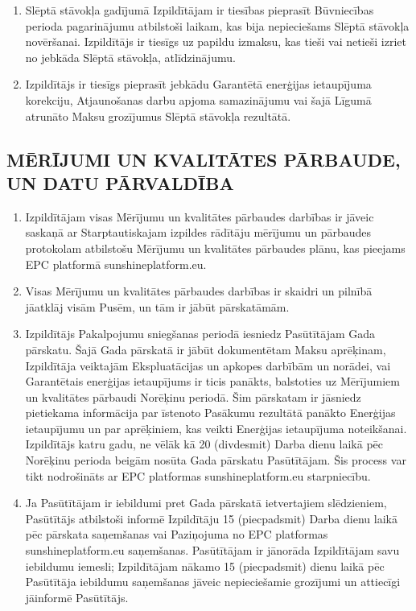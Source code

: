 \begin{multicols}{2}
\begin{enumerate}
	\item Slēptā stāvokļa gadījumā Izpildītājam ir tiesības pieprasīt Būvniecības perioda pagarinājumu atbilstoši laikam, kas bija nepieciešams Slēptā stāvokļa novēršanai. Izpildītājs ir tiesīgs uz papildu izmaksu, kas tieši vai netieši izriet no jebkāda Slēptā stāvokļa, atlīdzinājumu.
	\item Izpildītājs ir tiesīgs pieprasīt jebkādu Garantētā enerģijas ietaupījuma korekciju, Atjaunošanas darbu apjoma samazinājumu vai šajā Līgumā atrunāto Maksu grozījumus Slēptā stāvokļa rezultātā.
\end{enumerate}

\subsection{MĒRĪJUMI UN KVALITĀTES PĀRBAUDE, UN DATU PĀRVALDĪBA}
\begin{enumerate}
	\item Izpildītājam visas Mērījumu un kvalitātes pārbaudes darbības ir jāveic saskaņā ar Starptautiskajam izpildes rādītāju mērījumu un pārbaudes protokolam atbilstošu Mērījumu un kvalitātes pārbaudes plānu, kas pieejams EPC platformā sunshineplatform.eu.
	\item Visas Mērījumu un kvalitātes pārbaudes darbības ir skaidri un pilnībā jāatklāj visām Pusēm, un tām ir jābūt pārskatāmām.
	\item Izpildītājs Pakalpojumu sniegšanas periodā iesniedz Pasūtītājam Gada pārskatu. Šajā Gada pārskatā ir jābūt dokumentētam Maksu aprēķinam, Izpildītāja veiktajām Ekspluatācijas un apkopes darbībām un norādei, vai Garantētais enerģijas ietaupījums ir ticis panākts, balstoties uz Mērījumiem un kvalitātes pārbaudi Norēķinu periodā. Šim pārskatam ir jāsniedz pietiekama informācija par īstenoto Pasākumu rezultātā panākto Enerģijas ietaupījumu un par aprēķiniem, kas veikti Enerģijas ietaupījuma noteikšanai. Izpildītājs katru gadu, ne vēlāk kā 20 (divdesmit) Darba dienu laikā pēc Norēķinu perioda beigām nosūta Gada pārskatu Pasūtītājam. Šis process var tikt nodrošināts ar EPC platformas sunshineplatform.eu starpniecību.
	\item Ja Pasūtītājam ir iebildumi pret Gada pārskatā ietvertajiem slēdzieniem, Pasūtītājs atbilstoši informē Izpildītāju 15 (piecpadsmit) Darba dienu laikā pēc pārskata saņemšanas vai Paziņojuma no EPC platformas sunshineplatform.eu saņemšanas. Pasūtītājam ir jānorāda Izpildītājam savu iebildumu iemesli; Izpildītājam nākamo 15 (piecpadsmit) dienu laikā pēc Pasūtītāja iebildumu saņemšanas jāveic nepieciešamie grozījumi un attiecīgi jāinformē Pasūtītājs.

\end{enumerate}
\end{multicols}
